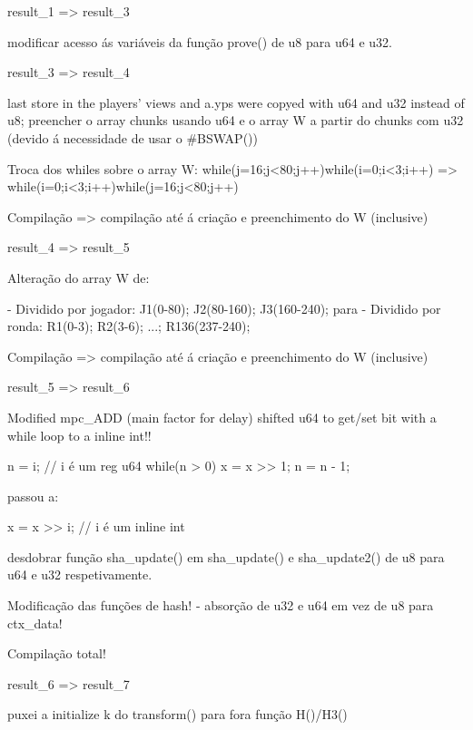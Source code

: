 result_1 => result_3

modificar acesso ás variáveis da função prove() de u8 para u64 e u32.

result_3 => result_4

last store in the players' views and a.yps were copyed with u64 and u32 instead of u8;
preencher o array chunks usando u64 e o array W a partir do chunks com u32 (devido á necessidade de usar o #BSWAP())

Troca dos whiles sobre o array W: 
while(j=16;j<80;j++){while(i=0;i<3;i++){}} => while(i=0;i<3;i++){while(j=16;j<80;j++){}}


Compilação => compilação até á criação e preenchimento do W (inclusive)

result_4 => result_5

Alteração do array W de:
	
	- Dividido por jogador: J1(0-80); J2(80-160); J3(160-240);
	 para
	- Dividido por ronda: R1(0-3); R2(3-6); ...; R136(237-240);


Compilação => compilação até á criação e preenchimento do W (inclusive)


result_5 => result_6



Modified mpc_ADD (main factor for delay) shifted u64 to get/set bit with a while loop to a inline int!!

	n = i;		     // i é um reg u64
	while(n > 0){
		x = x >> 1;
		n = n - 1;
	}

	passou a:

	x = x >> i;     // i é um inline int



desdobrar função sha_update() em sha_update() e sha_update2() de u8 para u64 e u32 respetivamente.


Modificação das funções de hash! - absorção de u32 e u64  em vez de u8 para ctx_data!


Compilação total!


result_6 => result_7

puxei a initialize k do transform() para fora função H()/H3()




